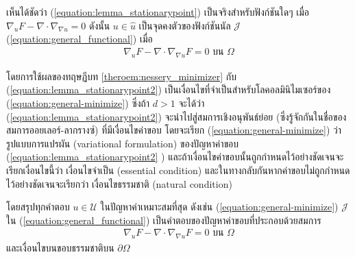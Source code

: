 เห็นได้ชัดว่า (\ref{equation:lemma_stationarypoint}) เป็นจริงสำหรับฟังก์ชันใดๆ เมื่อ $\nabla_u F - \nabla \cdot \nabla_{\nabla u} = 0$ ดังนั้น $u \in \hat{u}$ เป็นจุดคงตัวของฟังก์ชันนัล $\mathcal{J}$ (\ref{equation:general_functional}) เมื่อ 
\begin{align}
    \nabla_{u} F - \nabla \cdot \nabla_{\nabla u} F = 0 \text{ บน } \Omega
    \label{equation:lemma_stationarypoint2}
\end{align}

โดยการใช้ผลของทฤษฏีบท \ref{theroem:nessery_minimizer} กับ (\ref{equation:lemma_stationarypoint2}) เป็นเงื่อนไขที่จำเป็นสำหรับโลคอลมินิไมเซอร์ของ (\ref{equation:general-minimize}) ซึ่งถ้า $ d > 1$ จะได้ว่า (\ref{equation:lemma_stationarypoint2}) จะนำไปสู่สมการเชิงอนุพันธ์ย่อย (ซึ่งรู้จักกันในชื่อของสมการออยเลอร์-ลากรางซ์) ที่มีเงื่อนไขค่าขอบ โดยจะเรียก (\ref{equation:general-minimize}) ว่า รูปแบบการแปรผัน (variational formulation) ของปัญหาค่าขอบ (\ref{equation:lemma_stationarypoint2}
) และถ้าเงื่อนไขค่าขอบนั้นถูกกำหนดไว้อย่างชัดเจนจะเรียกเงื่อนไขนี้ว่า เงื่อนไขจำเป็น (essential condition) และในทางกลับกันหากค่าขอบไม่ถูกกำหนดไว้อย่างชัดเจนจะเรียกว่า เงื่อนไขธรรมชาติ (natural condition) 

โดยสรุปทุกคำตอบ $u \in \mathcal{U}$ ในปัญหาค่าเหมาะสมที่สุด ดังเช่น (\ref{equation:general-minimize}) $\mathcal{J}$ ใน (\ref{equation:general_functional}) เป็นคำตอบของปัญหาค่าขอบที่ประกอบด้วยสมการ
\begin{align*}
    \nabla_u F - \nabla \cdot \nabla_{\nabla u} F = 0 \text{ บน } \Omega 
\end{align*}
และเงื่อนไขบนขอบธรรมชาติบน $\partial \Omega$

